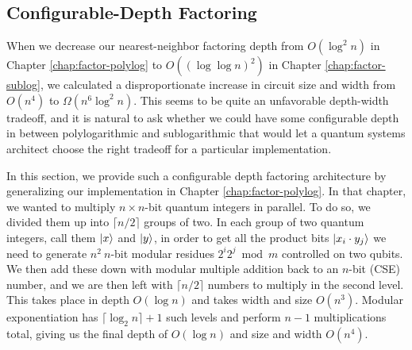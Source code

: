 

\subsection{Configurable-Depth Factoring}
\label{subsec:cohere-factor}

When we decrease our nearest-neighbor factoring depth from $O(\log^2 n)$
in Chapter \ref{chap:factor-polylog} to $O((\log\log n)^2)$ in
Chapter \ref{chap:factor-sublog}, we calculated a disproportionate
increase in circuit size and width from
$O(n^4)$ to $\Omega(n^6\log^2 n)$. This seems to be quite an
unfavorable depth-width tradeoff, and it is natural to ask whether
we could have some configurable depth in between
polylogarithmic and sublogarithmic that would let a quantum
systems architect choose the right tradeoff for a particular
implementation.

In this section, we provide such a configurable depth
factoring architecture by generalizing our implementation in
Chapter \ref{chap:factor-polylog}. In that chapter, we
wanted to multiply $n\times n$-bit quantum integers in parallel.
To do so, we divided them up into $\lceil n/2 \rceil$ groups of two.
In each group of two quantum integers, call them $\left\vert{x}\right\rangle$ and
$\left\vert{y}\right\rangle$, in order to get all the product bits
$\left\vert{x_i\cdot y_j}\right\rangle$ we need to generate $n^2 \ n$-bit modular residues
$2^i 2^j \bmod m$ controlled on two qubits. We then add these
down with modular multiple addition back to an $n$-bit (CSE) number,
and we are then left with $\lceil n/2 \rceil$ numbers to multiply in
the second level. This takes place in depth $O(\log n)$ and takes
width and size $O(n^3)$.
Modular exponentiation has $\lceil \log_2 n \rceil + 1$ such
levels and perform $n-1$ multiplications total, giving us the
final depth of $O(\log n)$ and size and width $O(n^4)$.

